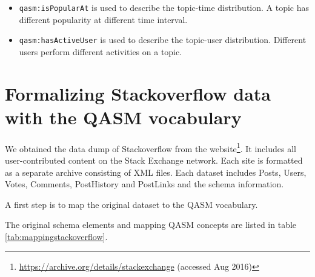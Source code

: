 \begin{itemize}
\item \texttt{qasm:isPopularAt} is used to describe the topic-time distribution. A topic has different popularity at different time interval.

\item \texttt{qasm:hasActiveUser} is used to describe the topic-user distribution. Different users perform different activities on a topic.
\end{itemize}





\section{Formalizing Stackoverflow data with the QASM vocabulary}

We obtained the data dump of Stackoverflow from the website\footnote{\url{https://archive.org/details/stackexchange} (accessed Aug 2016)}. It includes all user-contributed content on the Stack Exchange network. Each site is formatted as a separate archive consisting of XML files. Each dataset includes Posts, Users, Votes, Comments, PostHistory and PostLinks and the schema information.

A first step is to map the original dataset to the QASM vocabulary. 

The original schema elements and mapping QASM concepts are listed in table \ref{tab:mappingstackoverflow}.


